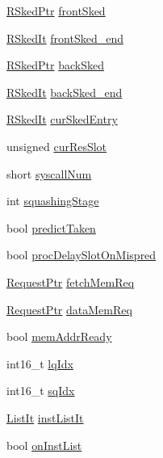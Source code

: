 \begin{DoxyCompactItemize}
\item 
\hyperlink{classResourceSked}{RSkedPtr} \hyperlink{classInOrderDynInst_a76a3bb102c3f09d0f6f8e13682e9d5bf}{frontSked}
\item 
\hyperlink{classRSkedIt}{RSkedIt} \hyperlink{classInOrderDynInst_a7570b2e0b2d325cc85f03fbd5511a1dd}{frontSked\_\-end}
\item 
\hyperlink{classResourceSked}{RSkedPtr} \hyperlink{classInOrderDynInst_a94ce1589c2fca1b4f1748d1ec3d672ed}{backSked}
\item 
\hyperlink{classRSkedIt}{RSkedIt} \hyperlink{classInOrderDynInst_a0aedf075a6afb4432fe7ea72e5ecbb29}{backSked\_\-end}
\item 
\hyperlink{classRSkedIt}{RSkedIt} \hyperlink{classInOrderDynInst_a1d3798dea407450f2597b9d2b5fd7c2f}{curSkedEntry}
\item 
unsigned \hyperlink{classInOrderDynInst_aa726453ebacb0095c190bcbab2826c87}{curResSlot}
\item 
short \hyperlink{classInOrderDynInst_a7d7da113347fdefcd5ad59f29769df0b}{syscallNum}
\item 
int \hyperlink{classInOrderDynInst_af84b7d3bf213abe92efa728d6e2ff135}{squashingStage}
\item 
bool \hyperlink{classInOrderDynInst_a5e713bb734d21ac79e0a697d5d47f17c}{predictTaken}
\item 
bool \hyperlink{classInOrderDynInst_adb0d78d0489a3cf988fc32bca99ae9ec}{procDelaySlotOnMispred}
\item 
\hyperlink{classRequest}{RequestPtr} \hyperlink{classInOrderDynInst_a6b197a69853684b56aa7016c2db75850}{fetchMemReq}
\item 
\hyperlink{classRequest}{RequestPtr} \hyperlink{classInOrderDynInst_a15297c5fb430116b63bb672c74c8fac2}{dataMemReq}
\item 
bool \hyperlink{classInOrderDynInst_a5221fc01c16ee159462069b0e45a4159}{memAddrReady}
\item 
int16\_\-t \hyperlink{classInOrderDynInst_a543896e8c656ce7cce978a1ec4d29afe}{lqIdx}
\item 
int16\_\-t \hyperlink{classInOrderDynInst_a9f5a94c5a008c1580f89d38e425a6528}{sqIdx}
\item 
\hyperlink{classInOrderDynInst_a184cb829e22cc656acb41864f68f51ea}{ListIt} \hyperlink{classInOrderDynInst_ae774064514a3dc6a8d932c1fb975d37f}{instListIt}
\item 
bool \hyperlink{classInOrderDynInst_a26c717ec900acf936d937cd19b110ee7}{onInstList}
\end{DoxyCompactItemize}
